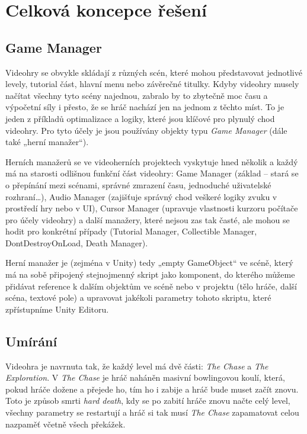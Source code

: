 \chapter{Celková koncepce řešení}

\section{Game Manager}
Videohry se obvykle skládají z různých scén, které mohou představovat jednotlivé levely, tutorial část, hlavní menu nebo závěrečné titulky. Kdyby videohry musely načítat všechny tyto scény najednou, zabralo by to zbytečně moc času a výpočetní síly i přesto, že se hráč nachází jen na jednom z těchto míst. To je jeden z příkladů optimalizace a logiky, které jsou klíčové pro plynulý chod videohry. Pro tyto účely je jsou používány objekty typu \emph{Game Manager} (dále také „herní manažer“).

Herních manažerů se ve videoherních projektech vyskytuje hned několik a každý má na starosti odlišnou funkční část videohry: Game Manager (základ -- stará se o přepínání mezi scénami, správné zmrazení času, jednoduché uživatelské rozhraní…), Audio Manager (zajišťuje správný chod veškeré logiky zvuku   v prostředí hry nebo v UI), Cursor Manager (upravuje vlastnosti kurzoru počítače pro účely videohry) a další manažery, které nejsou zas tak časté, ale mohou se hodit pro konkrétní případy (Tutorial Manager, Collectible Manager, DontDestroyOnLoad, Death Manager).

Herní manažer je (zejména v Unity) tedy „empty GameObject“ ve scéně, který má na sobě připojený stejnojmenný skript jako komponent, do kterého můžeme přidávat reference k dalším objektům ve scéně nebo v projektu (tělo hráče, další scéna, textové pole) a upravovat jakékoli parametry tohoto skriptu, které zpřístupníme Unity Editoru.

\section{Umírání}
Videohra je navrnuta tak, že každý level má dvě části: \emph{The Chase} a \emph{The Exploration}. V \emph{The Chase} je hráč naháněn masivní bowlingovou koulí, která, pokud hráče dožene a přejede ho, tím ho i zabije a hráč bude muset začít znovu. Toto je způsob smrti \emph{hard death}, kdy se po zabití hráče znovu načte celý level, všechny parametry se restartují a hráč si tak musí \emph{The Chase} zapamatovat celou nazpaměť včetně všech překážek.

